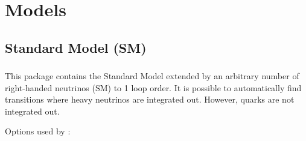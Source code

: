 \documentclass[10pt,a4paper,twoside]{scrartcl}
\begin{document}
  












\section{Models\label{sec:Models}}


\subsection{Standard Model (SM)}

\subsubsection[\package{RGESM}]{}
This package contains the Standard Model extended by an arbitrary number of right-handed neutrinos (SM)
to 1 loop order.  It is possible to automatically find transitions where heavy
neutrinos are integrated out.  However, quarks are not integrated out.

\vspace{2ex}

Options used by :
\end{document}
